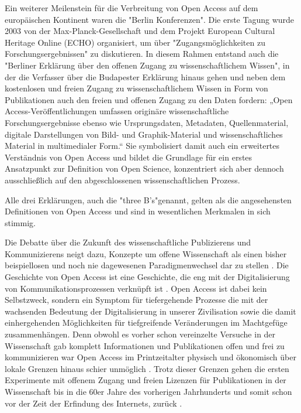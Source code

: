\begin{enumerate}
Ein weiterer Meilenstein für die Verbreitung von Open Access auf dem europäischen Kontinent waren die "Berlin Konferenzen"\cite{CREATe_2014}. Die erste Tagung wurde 2003 von der Max-Planck-Gesellschaft und dem Projekt European Cultural Heritage Online (ECHO) organisiert, um über "Zugangsmöglichkeiten zu Forschungsergebnissen" zu diskutieren. In diesem Rahmen entstand auch die "Berliner Erklärung über den offenen Zugang zu wissenschaftlichem Wissen"\cite{berliner_erklaerung_2003}, in der die Verfasser über die Budapester Erklärung hinaus gehen und neben dem kostenlosen und freien Zugang zu wissenschaftlichem Wissen in Form von Publikationen auch den freien und offenen Zugang zu den Daten fordern: „Open Access-Veröffentlichungen umfassen originäre wissenschaftliche Forschungsergebnisse ebenso wie Ursprungsdaten, Metadaten, Quellenmaterial, digitale Darstellungen von Bild- und Graphik-Material und wissenschaftliches Material in multimedialer Form.“\cite{berliner_erklaerung_2003} Sie symbolisiert damit auch ein erweitertes Verständnis von Open Access und bildet die Grundlage für ein erstes Ansatzpunkt zur Definition von Open Science, konzentriert sich aber dennoch ausschließlich auf den abgeschlossenen wissenschaftlichen Prozess\cite{suchen}.

\end{enumerate}

Alle drei Erklärungen, auch die "three B's"\cite{suber_2004_praising_oa}genannt, gelten als die angesehensten Definitionen von Open Access und sind in wesentlichen Merkmalen in sich stimmig\cite{albert_2006_open_implications}.

Die Debatte über die Zukunft des wissenschaftliche Publizierens und Kommunizierens neigt dazu, Konzepte um offene Wissenschaft als einen bisher beispiellosen und noch nie dagewesenen Paradigmenwechsel dar zu stellen \cite{cite:17a} \cite{cite:17b}. Die Geschichte von Open Access ist eine Geschichte, die eng mit der Digitalisierung von Kommunikationsprozessen verknüpft ist \cite{albert_2006_open_implications}. Open Access ist dabei kein Selbstzweck\cite{cite:17d}, sondern ein Symptom für tiefergehende Prozesse die mit der wachsenden Bedeutung der Digitalisierung in unserer Zivilisation sowie die damit einhergehenden Möglichkeiten für tiefgreifende Veränderungen im Machtgefüge zusammenhängen\cite{cite:17e}. Denn obwohl es vorher schon vereinzelte Versuche in der Wissenschaft gab komplett Informationen und Publikationen offen und frei zu kommunizieren war Open Access im Printzeitalter physisch und ökonomisch über lokale Grenzen hinaus schier unmöglich \cite{cite:18a}. Trotz dieser Grenzen gehen die ersten Experimente mit offenem Zugang und freien Lizenzen für Publikationen in der Wissenschaft bis in die 60er Jahre des vorherigen Jahrhunderts und somit schon vor der Zeit der Erfindung des Internets, zurück \cite{cite:18b}. 

